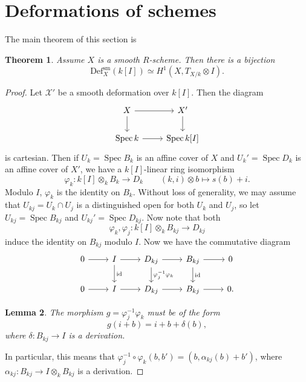 \documentclass[leqno, openany]{memoir}
\newtheorem{thm}{Theorem}[section]
\newtheorem{lem}[thm]{Lemma}
\theoremstyle{definition}
\theoremstyle{remark}
\theoremstyle{plain}
\theoremstyle{definition}
\theoremstyle{remark}
\newcommand{\mc}[1]{\mathcal{#1}}
\newcommand{\mr}[1]{\mathrm{#1}}
\DeclareMathOperator{\Spec}{Spec}
\begin{document}
\section{Deformations of schemes}%
\label{sec:deformations_of_schemes}

The main theorem of this section is
\begin{thm}
    Assume $X$ is a smooth $R$-scheme. Then there is a bijection
    \[ \mr{Def}_X^{\mr{sm}}(k[I]) \simeq H^1(X, T_{X/k} \otimes I). \]
\end{thm}

\begin{proof}
    Let $\mc{X}'$ be a smooth deformation over $k[I]$. Then the diagram
    \begin{equation*}
    \begin{tikzcd}
        X \ar{r} \ar{d} & X' \ar{d} \\
        \Spec k \ar{r} & \Spec k[I]
    \end{tikzcd}
    \end{equation*}
    is cartesian. Then if $U_k = \Spec B_k$ is an affine cover of $X$ and $U_k' = \Spec D_k$ is an affine cover of $X'$, we have a $k[I]$-linear ring isomorphism
    \[ \varphi_k \colon k[I] \otimes_k B_k \to D_k \qquad (k,i) \otimes b \mapsto s(b) + i. \]
    Modulo $I$, $\varphi_k$ is the identity on $B_k$. Without loss of generality, we may assume that $U_{kj} = U_k \cap U_j$ is a distinguished open for both $U_k$ and $U_j$, so let $U_{kj} = \Spec B_{kj}$ and $U_{kj}' = \Spec D_{kj}$. Now note that both
    \[ \varphi_k, \varphi_j \colon k[I] \otimes_k B_{kj} \to D_{kj} \]
    induce the identity on $B_{kj}$ modulo $I$. Now we have the commutative diagram
    \begin{equation*}
    \begin{tikzcd}
        0 \ar{r} & I \ar{d}{\mr{id}} \ar{r} & D_{kj} \ar{d}{\varphi_j^{-1} \varphi_k} \ar{r} & B_{kj} \ar{d}{\mr{id}} \ar{r} & 0 \\
        0 \ar{r} & I \ar{r} & D_{kj} \ar{r} & B_{kj} \ar{r} & 0.
    \end{tikzcd}
    \end{equation*}
    \begin{lem}
        The morphism $g = \varphi_j^{-1} \varphi_k$ must be of the form
        \[ g(i+b) = i + b + \delta(b), \]
        where $\delta \colon B_{kj} \to I$ is a derivation. 
    \end{lem}
    In particular, this means that $\varphi_j^{-1} \circ \varphi_k(b, b') = (b, \alpha_{kj}(b) + b')$, where $\alpha_{kj} \colon B_{kj} \to I \otimes_k B_{kj}$ is a derivation.


\end{proof}
\end{document}
